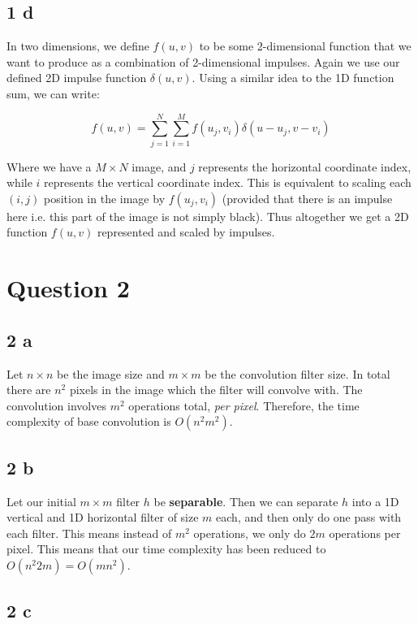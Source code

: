 \documentclass{article}
\begin{document}
\subsection{1 d}

In two dimensions, we define $f(u,v)$ to be some 2-dimensional function that we want to produce as a combination of 2-dimensional impulses. Again we use our defined 2D impulse function $\delta(u,v)$. Using a similar idea to the 1D function sum, we can write:

$$f(u,v) = \sum_{j = 1}^{N} \sum_{i = 1}^{M} f(u_j, v_i)\delta(u - u_j, v - v_i)$$

\noindent
Where we have a $M \times N$ image, and $j$ represents the horizontal coordinate index, while $i$ represents the vertical coordinate index. This is equivalent to scaling each $(i,j)$ position in the image by $f(u_j, v_i)$ (provided that there is an impulse here i.e. this part of the image is not simply black). Thus altogether we get a 2D function $f(u,v)$ represented and scaled by impulses.

\section{Question 2}

\subsection{2 a}

Let $n \times n$ be the image size and $m \times m$ be the convolution filter size. In total there are $n^2$ pixels in the image which the filter will convolve with. The convolution involves $m^2$ operations total, \textit{per pixel}. Therefore, the time complexity of base convolution is $O(n^2 m^2)$.

\subsection{2 b}

Let our initial $m \times m$ filter $h$ be \textbf{separable}. Then we can separate $h$ into a 1D vertical and 1D horizontal filter of size $m$ each, and then only do one pass with each filter. This means instead of $m^2$ operations, we only do $2m$ operations per pixel. This means that our time complexity has been reduced to $O(n^2 2m) = O(m n^2)$.

\subsection{2 c}
\end{document}
